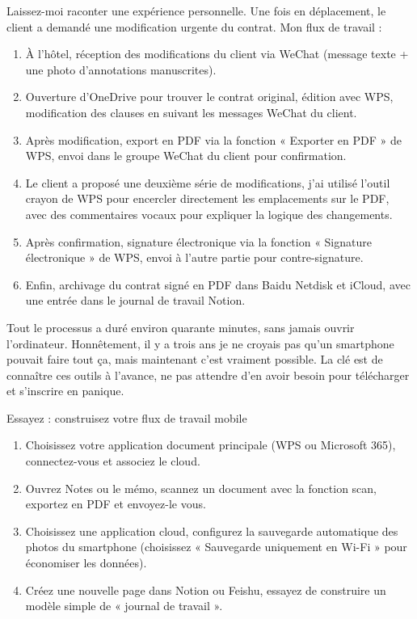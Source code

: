 
Laissez-moi raconter une expérience personnelle. Une fois en déplacement, le client a demandé une modification urgente du contrat. Mon flux de travail :

\begin{enumerate}
  \item À l'hôtel, réception des modifications du client via WeChat (message texte + une photo d'annotations manuscrites).
  \item Ouverture d'OneDrive pour trouver le contrat original, édition avec WPS, modification des clauses en suivant les messages WeChat du client.
  \item Après modification, export en PDF via la fonction « Exporter en PDF » de WPS, envoi dans le groupe WeChat du client pour confirmation.
  \item Le client a proposé une deuxième série de modifications, j'ai utilisé l'outil crayon de WPS pour encercler directement les emplacements sur le PDF, avec des commentaires vocaux pour expliquer la logique des changements.
  \item Après confirmation, signature électronique via la fonction « Signature électronique » de WPS, envoi à l'autre partie pour contre-signature.
  \item Enfin, archivage du contrat signé en PDF dans Baidu Netdisk et iCloud, avec une entrée dans le journal de travail Notion.
\end{enumerate}

Tout le processus a duré environ quarante minutes, sans jamais ouvrir l'ordinateur. Honnêtement, il y a trois ans je ne croyais pas qu'un smartphone pouvait faire tout ça, mais maintenant c'est vraiment possible. La clé est de connaître ces outils à l'avance, ne pas attendre d'en avoir besoin pour télécharger et s'inscrire en panique.

\begin{tcbpractice}{Essayez : construisez votre flux de travail mobile}
\begin{enumerate}
  \item Choisissez votre application document principale (WPS ou Microsoft 365), connectez-vous et associez le cloud.
  \item Ouvrez Notes ou le mémo, scannez un document avec la fonction scan, exportez en PDF et envoyez-le vous.
  \item Choisissez une application cloud, configurez la sauvegarde automatique des photos du smartphone (choisissez « Sauvegarde uniquement en Wi-Fi » pour économiser les données).
  \item Créez une nouvelle page dans Notion ou Feishu, essayez de construire un modèle simple de « journal de travail ».
\end{enumerate}

\end{tcbpractice}
